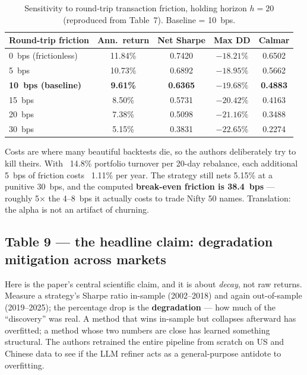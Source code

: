 \documentclass[11pt,a4paper]{article}
\begin{document}
\begin{table}[H]
\centering\small
\caption{Sensitivity to round-trip transaction friction, holding horizon
$h=20$ (reproduced from Table~7). Baseline = 10~bps.}
\label{tab:costs}
\begin{tabular}{@{}lcccc@{}}
\toprule
\textbf{Round-trip friction} & \textbf{Ann.\ return} & \textbf{Net Sharpe} &
\textbf{Max DD} & \textbf{Calmar} \\
\midrule
0~bps (frictionless) & 11.84\% & 0.7420 & $-18.21\%$ & 0.6502 \\
5~bps                & 10.73\% & 0.6892 & $-18.95\%$ & 0.5662 \\
\textbf{10~bps (baseline)} & \textbf{9.61\%} & \textbf{0.6365} & $-19.68\%$ & \textbf{0.4883} \\
15~bps               & 8.50\%  & 0.5731 & $-20.42\%$ & 0.4163 \\
20~bps               & 7.38\%  & 0.5098 & $-21.16\%$ & 0.3488 \\
30~bps               & 5.15\%  & 0.3831 & $-22.65\%$ & 0.2274 \\
\bottomrule
\end{tabular}
\end{table}

\begin{plaineng}
Costs are where many beautiful backtests die, so the authors deliberately try
to kill theirs. With ~14.8\% portfolio turnover per 20-day rebalance, each
additional 5~bps of friction costs ~1.11\% per year. The strategy still nets
5.15\% at a punitive 30~bps, and the computed \textbf{break-even friction is
38.4~bps} --- roughly 5$\times$ the 4--8~bps it actually costs to trade Nifty
50 names. Translation: the alpha is not an artifact of churning.
\end{plaineng}

\subsection{Table 9 --- the headline claim: degradation mitigation across markets}

\begin{plaineng}
Here is the paper's central scientific claim, and it is about \emph{decay},
not raw returns. Measure a strategy's Sharpe ratio in-sample (2002--2018) and
again out-of-sample (2019--2025); the percentage drop is the
\textbf{degradation} --- how much of the ``discovery'' was real. A method that
wins in-sample but collapses afterward has overfitted; a method whose two
numbers are close has learned something structural. The authors retrained the
entire pipeline from scratch on US and Chinese data to see if the LLM refiner
acts as a general-purpose antidote to overfitting.
\end{plaineng}
\end{document}
